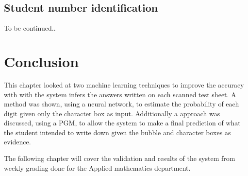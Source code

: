 \subsection{Student number identification}
\label{sec:pgmStudentNum}
To be continued..
\section{Conclusion}

This chapter looked at two machine learning techniques to improve the accuracy with with the system infers the answers written on each scanned test sheet. A method was shown, using a neural network, to estimate the probability of each digit given only the character box as input. Additionally a approach was discussed, using a PGM, to allow the system to make a final prediction of what the student intended to write down given the bubble and character boxes as evidence.

The following chapter will cover the validation and results of the system from weekly grading done for the Applied mathematics department.